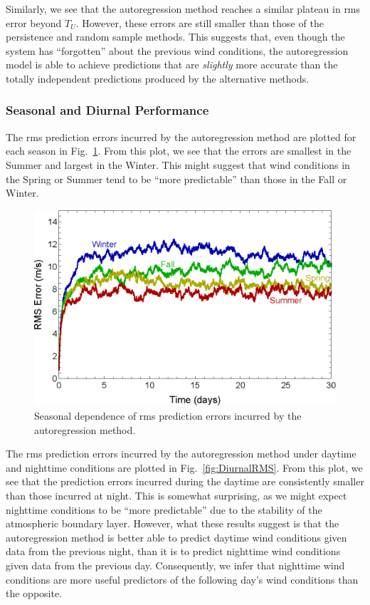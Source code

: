 \documentclass[11pt, oneside]{article}
\newcommand{\figref}[1]{Fig.~\ref{#1}}
\begin{document}
Similarly, we see that the autoregression method reaches a similar plateau in rms error beyond $T_U$.
However, these errors are still smaller than those of the persistence and random sample methods.
This suggests that, even though the system has ``forgotten'' about the previous wind conditions, the autoregression model is able to achieve predictions that are \textit{slightly} more accurate than the totally independent predictions produced by the alternative methods.

\subsubsection{Seasonal and Diurnal Performance}
The rms prediction errors incurred by the autoregression method are plotted for each season in \figref{fig:SeasonalRMS}.
From this plot, we see that the errors are smallest in the Summer and largest in the Winter.
This might suggest that wind conditions in the Spring or Summer tend to be ``more predictable'' than those in the Fall or Winter.

\begin{figure}[htb]
\centering
\includegraphics[width=0.7\columnwidth]{figures/SeasonalRMSPredictionError}
\caption{Seasonal dependence of rms prediction errors incurred by the autoregression method.}
\label{fig:SeasonalRMS}
\end{figure}

The rms prediction errors incurred by the autoregression method under daytime and nighttime conditions are plotted in \figref{fig:DiurnalRMS}.
From this plot, we see that the prediction errors incurred during the daytime are consistently smaller than those incurred at night.
This is somewhat surprising, as we might expect nighttime conditions to be ``more predictable'' due to the stability of the atmospheric boundary layer.
However, what these results suggest is that the autoregression method is better able to predict daytime wind conditions given data from the previous night, than it is to predict nighttime wind conditions given data from the previous day.
Consequently, we infer that nighttime wind conditions are more useful predictors of the following day's wind conditions than the opposite.
\end{document}
